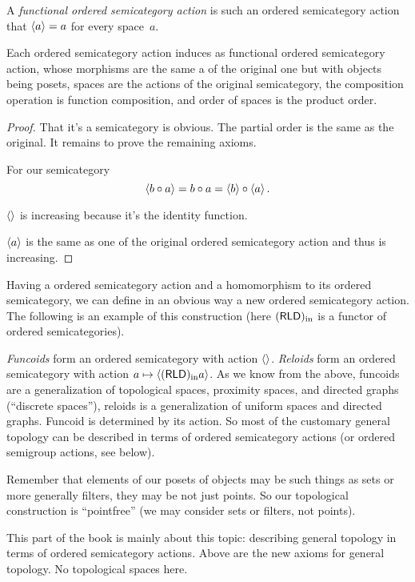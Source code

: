 \begin{defn}
A \emph{functional ordered semicategory action} is such an ordered semicategory action that $\left\langle a\right\rangle=a$ for every space~$a$.
\end{defn}

\begin{thm}
Each ordered semicategory action induces as functional ordered semicategory action, whose morphisms are the same a of the original one but with objects being posets, spaces are the actions of the original semicategory, the composition operation is function composition, and order of spaces is the product order.
\end{thm}

\begin{proof}
That it's a semicategory is obvious. The partial order is the same as the original. It remains to prove the remaining axioms.

For our semicategory
\[ \left\langle b\circ a\right\rangle = b\circ a=\left\langle b\right\rangle\circ \left\langle a\right\rangle. \]

$\left\langle \right\rangle$ is increasing because it's the identity function.

$\left\langle a\right\rangle$ is the same as one of the original ordered semicategory action and thus is increasing.
\end{proof}

Having a ordered semicategory action and a homomorphism to its ordered semicategory, we can define in an obvious way a new ordered semicategory action. The following is an example of this construction (here $(\mathsf{RLD})_{\mathrm{in}}$ is a functor of ordered semicategories).

\emph{Funcoids} form an ordered semicategory with action $\left\langle \right\rangle$. \emph{Reloids} form an ordered semicategory with action $a\mapsto\left\langle (\mathsf{RLD})_{\mathrm{in}} a\right\rangle$.
As we know from the above, funcoids are a generalization of topological spaces, proximity spaces, and directed graphs (``discrete spaces''), reloids is a generalization of uniform spaces and directed graphs. Funcoid is determined by its action. So most of the customary general topology can be described in terms of ordered semicategory actions (or ordered semigroup actions, see below).

Remember that elements of our posets of objects may be such things as sets or more generally filters, they may be not just points. So our topological construction is ``pointfree'' (we may consider sets or filters, not points).

This part of the book is mainly about this topic: describing general topology in terms of ordered semicategory actions. Above are the new axioms for general topology. No topological spaces here.


